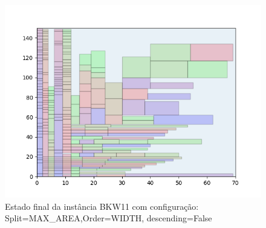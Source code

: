 \begin{figure}[H]
    \centering
    \caption[]{Estado final da instância BKW11 com configuração: Split=MAX_AREA,Order=WIDTH, descending=False}
    \label{fig:bkw11-max_area-width-false}
    \includegraphics[scale=0.5]{output/figures/bkw/bkw11/max_area/width/false/000}
\end{figure}